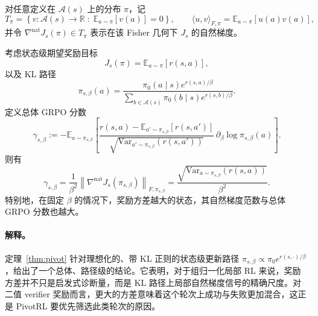 对任意定义在 $\mathcal{A}(s)$ 上的分布 $\pi$，记
\[
T_\pi
=
\left\{
v:\mathcal{A}(s)\to\mathbb{R}
\;:\;
\mathbb{E}_{a\sim\pi}[v(a)]=0
\right\},
\qquad
\langle u,v\rangle_{F,\pi}
=
\mathbb{E}_{a\sim\pi}[u(a)v(a)],
\]
并令 $\nabla^{\mathrm{nat}}J_s(\pi)\in T_\pi$ 表示在该 Fisher 几何下 $J_s$ 的自然梯度。

\begin{theorem}
\label{thm:pivot}
考虑状态级期望奖励目标
\[
J_s(\pi)=\mathbb{E}_{a\sim\pi}[r(s,a)],
\]
以及 KL 路径
\[
\pi_{s,\beta}(a)
=
\frac{
\pi_0(a\mid s)e^{r(s,a)/\beta}
}{
\sum_{b\in \mathcal{A}(s)} \pi_0(b\mid s)e^{r(s,b)/\beta}
}.
\]
定义总体 GRPO 分数
\begin{equation}
\gamma_{s,\beta}
:=
-
\mathbb{E}_{a\sim \pi_{s,\beta}}
\left[
\frac{
r(s,a)-\mathbb{E}_{a'\sim\pi_{s,\beta}}[r(s,a')]
}{
\sqrt{\mathrm{Var}_{a'\sim\pi_{s,\beta}}(r(s,a'))}
}
\,\partial_\beta \log \pi_{s,\beta}(a)
\right].
\label{eq:grpo_score}
\end{equation}
则有
\begin{equation}
\gamma_{s,\beta}
=
\frac{1}{\beta^2}
\left\|
\nabla^{\mathrm{nat}}J_s(\pi_{s,\beta})
\right\|_{F,\pi_{s,\beta}}
=
\frac{
\sqrt{\mathrm{Var}_{a\sim\pi_{s,\beta}}(r(s,a))}
}{\beta^2}.
\label{eq:pivot_theorem}
\end{equation}
特别地，在固定 $\beta$ 的情况下，奖励方差越大的状态，其自然梯度范数与总体 GRPO 分数也越大。
\end{theorem}

\paragraph{解释。}
定理~\ref{thm:pivot} 针对理想化的、带 KL 正则的状态级更新路径 $\pi_{s,\beta}\propto \pi_0 e^{r(s,\cdot)/\beta}$，给出了一个总体、路径级的结论。它表明，对于组归一化局部 RL 来说，奖励方差并不只是启发式诊断量，而是 KL 路径上局部自然梯度信号的精确尺度。对二值 verifier 奖励而言，更大的方差意味着这个轮次上成功与失败更加混合，这正是 PivotRL 要优先筛选此类轮次的原因。

